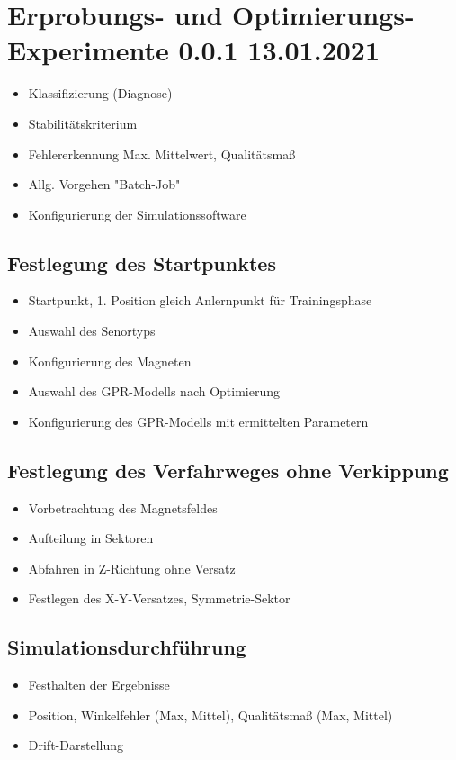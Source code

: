 %

\chapter{Erprobungs- und Optimierungs-Experimente 0.0.1 13.01.2021}\label{ch:erprobungs-u-opt-exp}
	\begin{itemize}
		\item Klassifizierung (Diagnose)
		\item Stabilitätskriterium
		\item Fehlererkennung Max. Mittelwert, Qualitätsmaß
		\item Allg. Vorgehen "Batch-Job"
		\item Konfigurierung der Simulationssoftware
	\end{itemize}

\section{Festlegung des Startpunktes}\label{sec:festlegung-des-startpunktes}
	\begin{itemize}
		\item Startpunkt, 1. Position gleich Anlernpunkt für Trainingsphase
		\item Auswahl des Senortyps
		\item Konfigurierung des Magneten
		\item Auswahl des GPR-Modells nach Optimierung
		\item Konfigurierung des GPR-Modells mit ermittelten Parametern
	\end{itemize}

\section{Festlegung des Verfahrweges ohne Verkippung}\label{sec:festlegung-verfahrwe-ohne-verkippung}
	\begin{itemize}
		\item Vorbetrachtung des Magnetsfeldes 
		\item Aufteilung in Sektoren
		\item Abfahren in Z-Richtung ohne Versatz
		\item Festlegen des X-Y-Versatzes, Symmetrie-Sektor		
	\end{itemize}

\section{Simulationsdurchführung}\label{sec:simulationsdurchfuehrung}
	\begin{itemize}
		\item Festhalten der Ergebnisse
		\item Position, Winkelfehler (Max, Mittel), Qualitätsmaß (Max, Mittel)
		\item Drift-Darstellung
	\end{itemize}
	
